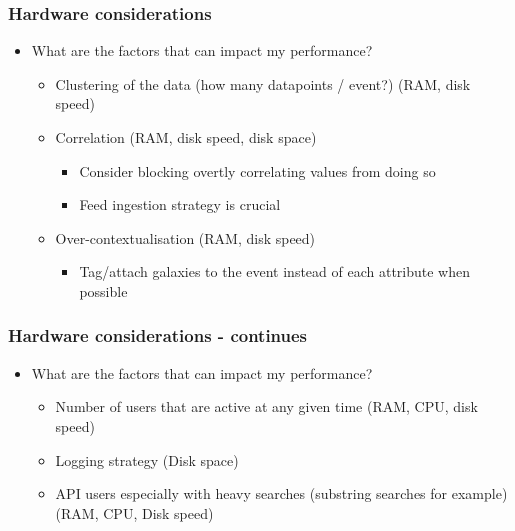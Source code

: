 \begin{frame}
\frametitle{Hardware considerations}
    \begin{itemize}
        \item What are the factors that can impact my performance?
        \begin{itemize}
            \item Clustering of the data (how many datapoints / event?) (RAM, disk speed)
            \item Correlation (RAM, disk speed, disk space)
            \begin{itemize}
                \item Consider blocking overtly correlating values from doing so
                \item Feed ingestion strategy is crucial
            \end{itemize}
            \item Over-contextualisation (RAM, disk speed)
            \begin{itemize}
                \item Tag/attach galaxies to the event instead of each attribute when possible
            \end{itemize}
        \end{itemize}
    \end{itemize}
\end{frame}

\begin{frame}
\frametitle{Hardware considerations - continues}
    \begin{itemize}
        \item What are the factors that can impact my performance?
        \begin{itemize}
            \item Number of users that are active at any given time (RAM, CPU, disk speed)
            \item Logging strategy (Disk space)
            \item API users especially with heavy searches (substring searches for example) (RAM, CPU, Disk speed)
        \end{itemize}
    \end{itemize}
\end{frame}

